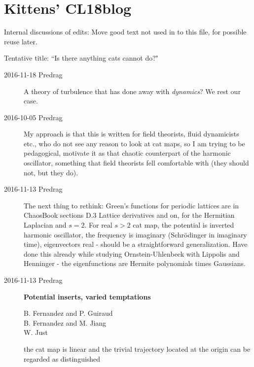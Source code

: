
\section{Kittens' CL18blog}
\label{s:CL18blog}

Internal discussions of  edits:
Move good text not used in  to this file, for possible
reuse later.

\bigskip

Tentative title:    ``Is there anything cats cannot do?"

\begin{description}

\item[2016-11-18 Predrag]
A theory of turbulence that has done away with \emph{dynamics}?
We rest our case.

\item[2016-10-05 Predrag]
My approach is that this is written for field theorists, fluid dynamicists
etc., who do not see any reason to look at cat maps, so I am trying to be
pedagogical, motivate it as that chaotic counterpart of the harmonic
oscillator, something that field theorists fell comfortable with (they should
not, but they do).

\item[2016-11-13 Predrag]
The next thing to rethink: Green's functions for periodic lattices are in
ChaosBook sections D.3 Lattice derivatives and on, for the Hermitian
Laplacian and $s=2$. For real $s>2$ cat map, the potential is inverted
harmonic oscillator, the frequency is imaginary (Schr\"odinger in
imaginary time), eigenvectors real - should
be a straightforward generalization. Have done this already while studying
Ornstein-Uhlenbeck with Lippolis and Henninger - the eigenfunctions are
Hermite polynomials times Gaussians.

\item[2016-11-13 Predrag]
{\bf Potential inserts, varied temptations}

B. Fernandez and P. Guiraud
\\
B. Fernandez and M. Jiang
\\
W. Just

\bigskip

the cat map is linear and the trivial trajectory located at the origin can be
regarded as distinguished


\end{description}
